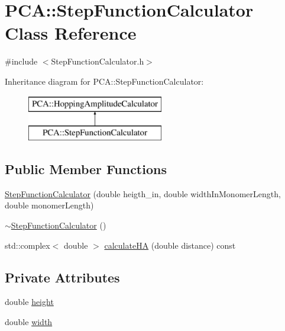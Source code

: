 \hypertarget{class_p_c_a_1_1_step_function_calculator}{}\section{P\+CA\+:\+:Step\+Function\+Calculator Class Reference}
\label{class_p_c_a_1_1_step_function_calculator}


{\ttfamily \#include $<$Step\+Function\+Calculator.\+h$>$}

Inheritance diagram for P\+CA\+:\+:Step\+Function\+Calculator\+:\begin{figure}[H]
\begin{center}
\leavevmode
\includegraphics[height=2.000000cm]{class_p_c_a_1_1_step_function_calculator}
\end{center}
\end{figure}
\subsection*{Public Member Functions}
\begin{DoxyCompactItemize}
\item 
\hyperlink{class_p_c_a_1_1_step_function_calculator_a9bf57193b40bb2b8a33fd5a5878b0b2a}{Step\+Function\+Calculator} (double heigth\+\_\+in, double width\+In\+Monomer\+Length, double monomer\+Length)
\item 
\hyperlink{class_p_c_a_1_1_step_function_calculator_a8f3de89d75389034ca485219ce74275b}{$\sim$\+Step\+Function\+Calculator} ()
\item 
std\+::complex$<$ double $>$ \hyperlink{class_p_c_a_1_1_step_function_calculator_a0607e2f78b6b7c0ed40083f921b58fdc}{calculate\+HA} (double distance) const
\end{DoxyCompactItemize}
\subsection*{Private Attributes}
\begin{DoxyCompactItemize}
\item 
double \hyperlink{class_p_c_a_1_1_step_function_calculator_a856f54997b5f0bfbe81040fa55f09146}{height}
\item 
double \hyperlink{class_p_c_a_1_1_step_function_calculator_a777b92937ec96bdc1dc8f887affcb8b3}{width}
\end{DoxyCompactItemize}


